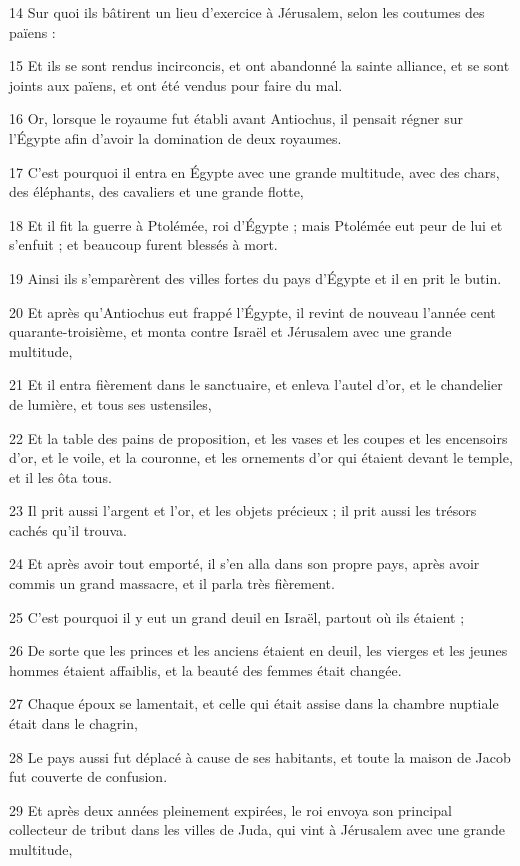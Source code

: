 \par 14 Sur quoi ils bâtirent un lieu d'exercice à Jérusalem, selon les coutumes des païens :
\par 15 Et ils se sont rendus incirconcis, et ont abandonné la sainte alliance, et se sont joints aux païens, et ont été vendus pour faire du mal.
\par 16 Or, lorsque le royaume fut établi avant Antiochus, il pensait régner sur l'Égypte afin d'avoir la domination de deux royaumes.
\par 17 C'est pourquoi il entra en Égypte avec une grande multitude, avec des chars, des éléphants, des cavaliers et une grande flotte,
\par 18 Et il fit la guerre à Ptolémée, roi d'Égypte ; mais Ptolémée eut peur de lui et s'enfuit ; et beaucoup furent blessés à mort.
\par 19 Ainsi ils s'emparèrent des villes fortes du pays d'Égypte et il en prit le butin.
\par 20 Et après qu'Antiochus eut frappé l'Égypte, il revint de nouveau l'année cent quarante-troisième, et monta contre Israël et Jérusalem avec une grande multitude,
\par 21 Et il entra fièrement dans le sanctuaire, et enleva l'autel d'or, et le chandelier de lumière, et tous ses ustensiles,
\par 22 Et la table des pains de proposition, et les vases et les coupes et les encensoirs d'or, et le voile, et la couronne, et les ornements d'or qui étaient devant le temple, et il les ôta tous.
\par 23 Il prit aussi l'argent et l'or, et les objets précieux ; il prit aussi les trésors cachés qu'il trouva.
\par 24 Et après avoir tout emporté, il s'en alla dans son propre pays, après avoir commis un grand massacre, et il parla très fièrement.
\par 25 C'est pourquoi il y eut un grand deuil en Israël, partout où ils étaient ;
\par 26 De sorte que les princes et les anciens étaient en deuil, les vierges et les jeunes hommes étaient affaiblis, et la beauté des femmes était changée.
\par 27 Chaque époux se lamentait, et celle qui était assise dans la chambre nuptiale était dans le chagrin,
\par 28 Le pays aussi fut déplacé à cause de ses habitants, et toute la maison de Jacob fut couverte de confusion.
\par 29 Et après deux années pleinement expirées, le roi envoya son principal collecteur de tribut dans les villes de Juda, qui vint à Jérusalem avec une grande multitude,
